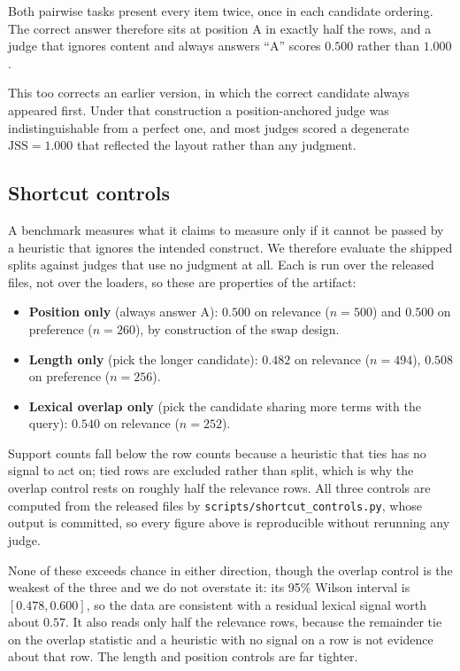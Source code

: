 Both pairwise tasks present every item twice, once in each candidate ordering.
The correct answer therefore sits at position A in exactly half the rows, and a
judge that ignores content and always answers ``A'' scores $0.500$ rather than
$1.000$.

This too corrects an earlier version, in which the correct candidate always
appeared first. Under that construction a position-anchored judge was
indistinguishable from a perfect one, and most judges scored a degenerate
$\mathrm{JSS}=1.000$ that reflected the layout rather than any judgment.

\subsection{Shortcut controls}
\label{sec:shortcuts}

A benchmark measures what it claims to measure only if it cannot be passed by a
heuristic that ignores the intended construct. We therefore evaluate the shipped
splits against judges that use no judgment at all. Each is run over the released
files, not over the loaders, so these are properties of the artifact:

\begin{itemize}
  \item \textbf{Position only} (always answer A): $0.500$ on relevance
    ($n=500$) and $0.500$ on preference ($n=260$), by construction of the swap
    design.
  \item \textbf{Length only} (pick the longer candidate): $0.482$ on relevance
    ($n=494$), $0.508$ on preference ($n=256$).
  \item \textbf{Lexical overlap only} (pick the candidate sharing more terms with
    the query): $0.540$ on relevance ($n=252$).
\end{itemize}

Support counts fall below the row counts because a heuristic that ties has no
signal to act on; tied rows are excluded rather than split, which is why the
overlap control rests on roughly half the relevance rows. All three controls are
computed from the released files by \texttt{scripts/shortcut\_controls.py}, whose
output is committed, so every figure above is reproducible without rerunning any
judge.

None of these exceeds chance in either direction, though the overlap control is
the weakest of the three and we do not overstate it: its 95\% Wilson interval is
$[0.478, 0.600]$, so the data are consistent with a residual lexical signal worth
about $0.57$. It also reads only half the relevance rows, because the remainder
tie on the overlap statistic and a heuristic with no signal on a row is not
evidence about that row. The length and position controls are far tighter.

